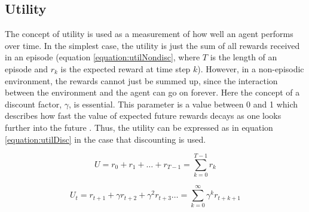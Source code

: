 \subsection{Utility}
\label{theBestLabelEvah}
\label{utility}
The concept of utility is used as a measurement of how well an agent performs over time. In the simplest case, the utility is just the sum of all rewards received in an episode (equation \eqref{equation:utilNondisc}, where $T$ is the length of an episode and $r_k$ is the expected reward at time step $k$). However, in a non-episodic environment, the rewards cannot just be summed up, since the interaction between the environment and the agent can go on forever. Here the concept of a discount factor, $\gamma$, is essential. This parameter is a value between 0 and 1 which describes how fast the value of expected future
rewards decays as one looks further into the future
\parencite{barto1998reinforcement}. Thus, the utility can be expressed as in equation \eqref{equation:utilDisc} in the case that discounting is used. 

\begin {equation}
\label{equation:utilNondisc}
U= r_0 + r_1 + \dots + r_{T-1} = \sum\limits_{k = 0}^{T-1} r_{k}
\end{equation}

\begin{equation}
\label{equation:utilDisc}
U_{t} = r_{t + 1} + \gamma r_{t + 2} + \gamma^2 r_{t + 3} \dots=  \sum\limits_{k = 0}^\infty \gamma^kr_{t+k+1}
\end{equation}






